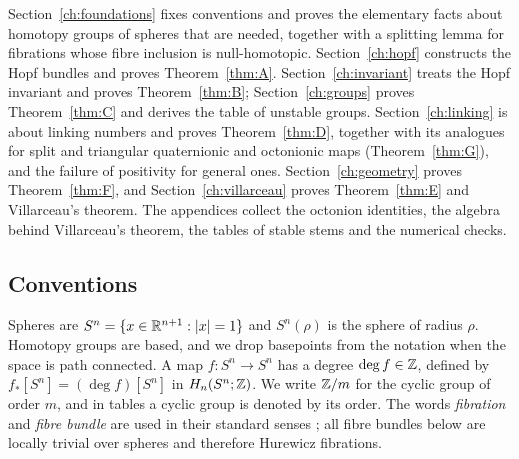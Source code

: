 Section~\ref{ch:foundations} fixes conventions and proves the elementary facts about homotopy groups of spheres that are needed, together with a splitting lemma for fibrations whose fibre inclusion is null-homotopic. Section~\ref{ch:hopf} constructs the Hopf bundles and proves Theorem~\ref{thm:A}. Section~\ref{ch:invariant} treats the Hopf invariant and proves Theorem~\ref{thm:B}; Section~\ref{ch:groups} proves Theorem~\ref{thm:C} and derives the table of unstable groups. Section~\ref{ch:linking} is about linking numbers and proves Theorem~\ref{thm:D}, together with its analogues for split and triangular quaternionic and octonionic maps (Theorem~\ref{thm:G}), and the failure of positivity for general ones. Section~\ref{ch:geometry} proves Theorem~\ref{thm:F}, and Section~\ref{ch:villarceau} proves Theorem~\ref{thm:E} and Villarceau's theorem. The appendices collect the octonion identities, the algebra behind Villarceau's theorem, the tables of stable stems and the numerical checks.

\subsection{Conventions}

Spheres are $S^n=\{x\in\mathbb{R}^{n+1}:|x|=1\}$ and $S^n(\rho)$ is the sphere of radius $\rho$. Homotopy groups are based, and we drop basepoints from the notation when the space is path connected. A map $f\colon S^n\to S^n$ has a degree $\deg f\in\mathbb{Z}$, defined by $f_*[S^n]=(\deg f)[S^n]$ in $H_n(S^n;\mathbb{Z})$. We write $\mathbb{Z}/m$ for the cyclic group of order $m$, and in tables a cyclic group is denoted by its order. The words \emph{fibration} and \emph{fibre bundle} are used in their standard senses \cite[Section~4.2]{Hat02}; all fibre bundles below are locally trivial over spheres and therefore Hurewicz fibrations.
